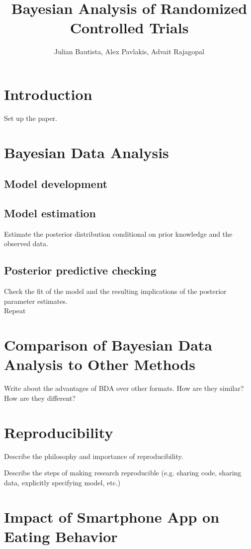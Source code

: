 \documentclass[12pt, oneside]{article}
\title{Bayesian Analysis of Randomized Controlled Trials}
\author{Julian Bautista, Alex Pavlakis, Advait Rajagopal}
\begin{document}
\maketitle

\abstract{}	

\newpage 

\tableofcontents
\newpage

\section{Introduction}
Set up the paper.

\section{Bayesian Data Analysis}

\subsection{Model development}


\subsection{Model estimation}
Estimate the posterior distribution conditional on prior knowledge and the observed data.
\subsection{Posterior predictive checking}
Check the fit of the model and the resulting implications of the posterior parameter estimates.
\\
Repeat

\section{Comparison of Bayesian Data Analysis to Other Methods}
Write about the advantages of BDA over other formats.  How are they similar?  How are they different?

\section{Reproducibility}
Describe the philosophy and importance of reproducibility.  

Describe the steps of making research reproducible (e.g. sharing code, sharing data, explicitly specifying model, etc.)

\section{Impact of Smartphone App on Eating Behavior}
\end{document}
